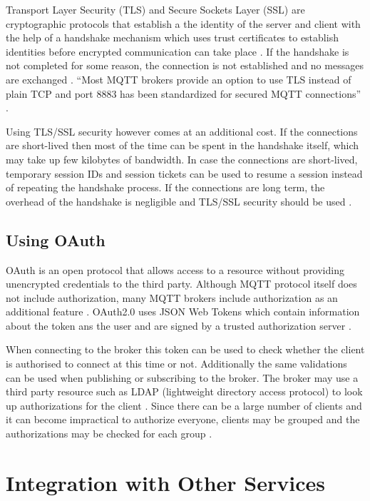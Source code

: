 \documentclass[sigconf]{acmart}
\begin{document}
Transport Layer Security (TLS) and Secure Sockets Layer (SSL) are
cryptographic protocols that establish a the identity of the server
and client with the help of a handshake mechanism which uses trust
certificates to establish identities before encrypted communication
can take place \cite{ibm-mqtt-security}. If the handshake is not
completed for some reason, the connection is not established and no
messages are exchanged \cite{mqtt-sec-ssl}. ``Most MQTT brokers
provide an option to use TLS instead of plain TCP and port 8883 has
been standardized for secured MQTT connections''
\cite{iot-design-mqtt-security}.

Using TLS/SSL security however comes at an additional cost. If the
connections are short-lived then most of the time can be spent in the
handshake itself, which may take up few kilobytes of bandwidth. In
case the connections are short-lived, temporary session IDs and
session tickets can be used to resume a session instead of repeating
the handshake process. If the connections are long term, the overhead
of the handshake is negligible and TLS/SSL security should be used
\cite{iot-design-mqtt-security}\cite{mqtt-sec-ssl}.

\subsection{Using OAuth}

OAuth is an open protocol that allows access to a resource without
providing unencrypted credentials to the third party. Although MQTT
protocol itself does not include authorization, many MQTT brokers
include authorization as an additional feature
\cite{ibm-mqtt-security}. OAuth2.0 uses JSON Web Tokens which contain
information about the token ans the user and are signed by a trusted
authorization server \cite{hivemq-security-oauth}.

When connecting to the broker this token can be used to check whether
the client is authorised to connect at this time or not. Additionally
the same validations can be used when publishing or subscribing to the
broker. The broker may use a third party resource such as LDAP
(lightweight directory access protocol) to look up authorizations for
the client \cite{hivemq-security-oauth}. Since there can be a large
number of clients and it can become impractical to authorize everyone,
clients may be grouped and the authorizations may be checked for each
group \cite{ibm-mqtt-security}.
  
\section{Integration with Other Services}
\end{document}
